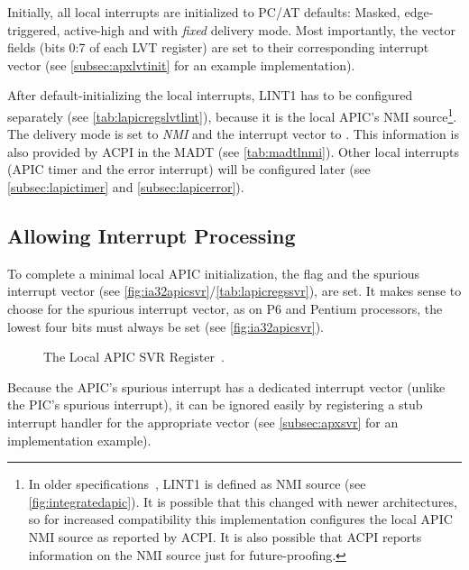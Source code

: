 Initially, all local interrupts are initialized to PC/AT defaults: Masked, edge-triggered, active-high and with \textit{fixed} delivery mode.
Most importantly, the vector fields (bits 0:7 of each LVT register) are set to their corresponding interrupt vector (see \autoref{subsec:apxlvtinit} for an example implementation).

After default-initializing the local interrupts, LINT1 has to be configured separately (see \autoref{tab:lapicregslvtlint}), because it is the local APIC's NMI source\footnote{
  In older specifications~\autocite{mpspec}, LINT1 is defined as NMI source (see \autoref{fig:integratedapic}).
  It is possible that this changed with newer architectures, so for increased compatibility this implementation configures the local APIC NMI source as reported by ACPI\@.
  It is also possible that ACPI reports information on the NMI source just for future-proofing.}.
The delivery mode is set to \textit{NMI} and the interrupt vector to .
This information is also provided by ACPI in the MADT (see \autoref{tab:madtlnmi}).
Other local interrupts (APIC timer and the error interrupt) will be configured later (see \autoref{subsec:lapictimer} and \autoref{subsec:lapicerror}).

\subsection{Allowing Interrupt Processing}
\label{subsec:lapicsoftenable}

To complete a minimal local APIC initialization, the  flag and the spurious interrupt vector (see \autoref{fig:ia32apicsvr}/\autoref{tab:lapicregssvr}), are set.
It makes sense to choose  for the spurious interrupt vector, as on P6 and Pentium processors, the lowest four bits must always be set (see \autoref{fig:ia32apicsvr}).

\begin{figure}[h]
  \centering
  \begin{subfigure}[b]{0.7\textwidth}
    
  \end{subfigure}
  \caption{The Local APIC SVR Register~\autocite[sec.~3.11.9]{ia32}.}
  \label{fig:ia32apicsvr}
\end{figure}

Because the APIC's spurious interrupt has a dedicated interrupt vector (unlike the PIC's spurious interrupt), it can be ignored easily by registering a stub interrupt handler for the appropriate vector (see \autoref{subsec:apxsvr} for an implementation example).

